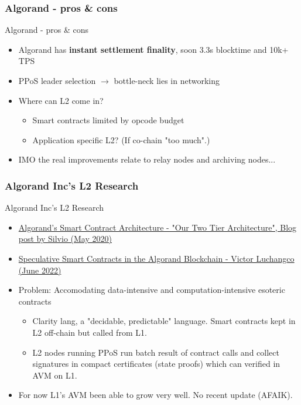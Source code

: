 \documentclass[aspectratio=169,xcolor=dvipsnames]{beamer}
\begin{document}
\subsubsection{Algorand - pros & cons}
\begin{frame}{Algorand - pros & cons}
\begin{itemize}
    \item Algorand has \textbf{instant settlement finality}, soon 3.3s blocktime and 10k+ TPS 
    \item PPoS leader selection $\rightarrow$ bottle-neck lies in networking
    \item Where can L2 come in?
    \begin{itemize}
        \item Smart contracts limited by opcode budget
        \item Application specific L2? (If co-chain "too much".)
    \end{itemize}
    \item IMO the real improvements relate to relay nodes and archiving nodes...
\end{itemize}
\end{frame}

\subsubsection{Algorand Inc's L2 Research}
\begin{frame}{Algorand Inc's L2 Research}
\begin{itemize}
    \item \href{https://algorand.com/resources/blog/algorand-smart-contract-architecture}{Algorand’s Smart Contract Architecture - "Our Two Tier Architecture", Blog post by Silvio (May 2020)}
    \item \href{https://www.youtube.com/watch?v=fIRu0FvEUwQ}{Speculative Smart Contracts in the Algorand Blockchain - Victor Luchangco (June 2022)}
    \item Problem: Accomodating data-intensive and computation-intensive esoteric contracts 
    \begin{itemize}
    \item Clarity lang, a "decidable, predictable" language. Smart contracts kept in L2 off-chain but called from L1.
    \item L2 nodes running PPoS run  batch result of contract calls and collect signatures in compact certificates (state proofs) which can verified in AVM on L1.
    \end{itemize}
    \item For now L1's AVM been able to grow very well. No recent update (AFAIK).
\end{itemize}
\end{frame}
\end{document}
